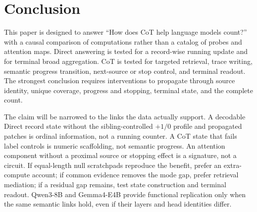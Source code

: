 \documentclass[11pt]{article}
\begin{document}







\section{Conclusion}

This paper is designed to answer ``How does CoT help language models count?''
with a causal comparison of computations rather than a catalog of probes and
attention maps. Direct answering is tested for a record-wise running update
and for terminal broad aggregation. CoT is tested for targeted retrieval,
trace writing, semantic progress transition, next-source or stop control, and
terminal readout. The strongest conclusion requires interventions to
propagate through source identity, unique coverage, progress and stopping,
terminal state, and the complete count.

The claim will be narrowed to the links the data actually support. A
decodable Direct record state without the sibling-controlled \(+1/0\) profile
and propagated patches is ordinal information, not a running counter. A CoT
state that fails label controls is numeric scaffolding, not semantic progress.
An attention component without a proximal source or stopping effect is a
signature, not a circuit. If equal-length null scratchpads reproduce the
benefit, prefer an extra-compute account; if common evidence removes the mode
gap, prefer retrieval mediation; if a residual gap remains, test state
construction and terminal readout. Qwen3-8B and Gemma4-E4B provide functional
replication only when the same semantic links hold, even if their layers and
head identities differ.

\clearpage



\appendix

\end{document}
